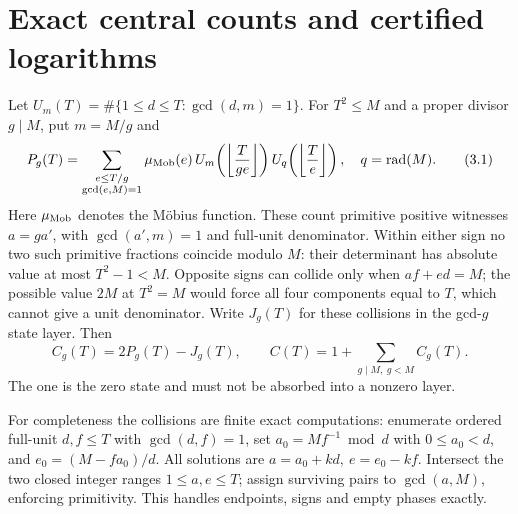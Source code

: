 \documentclass[11pt]{article}
\theoremstyle{definition}\newtheorem{definition}[theorem]{Definition}
\theoremstyle{remark}\newtheorem{remark}[theorem]{Remark}
\newcommand{\rad}{\operatorname{rad}}
\newcommand{\floor}[1]{\left\lfloor #1\right\rfloor}
\begin{document}
\section{Exact central counts and certified logarithms}\label{sec:cert}
Let \(U_m(T)=\#\{1\le d\le T:\gcd(d,m)=1\}\).
For \(T^2\le M\) and a proper divisor \(g\mid M\), put \(m=M/g\) and
\[
 P_g(T)=\sum_{\substack{e\le T/g\\\gcd(e,M)=1}}
     \mu_{\rm Mob}(e)\,
     U_m\!\left(\floor{\frac{T}{ge}}\right)
     U_q\!\left(\floor{\frac Te}\right),\quad q=\rad(M). \tag{3.1}\label{eq:Pg}
\]
Here \(\mu_{\rm Mob}\) denotes the Möbius function.
These count primitive positive witnesses \(a=ga'\), with
\(\gcd(a',m)=1\) and full-unit denominator.
Within either sign no two such primitive fractions coincide modulo \(M\):
their determinant has absolute value at most \(T^2-1<M\).
Opposite signs can collide only when \(af+ed=M\); the possible value \(2M\)
at \(T^2=M\) would force all four components equal to \(T\), which cannot
give a unit denominator. Write \(J_g(T)\) for these collisions in the
gcd-\(g\) state layer. Then
\[
 C_g(T)=2P_g(T)-J_g(T),\qquad
 C(T)=1+\sum_{g\mid M,\ g<M}C_g(T).                   \tag{3.2}\label{eq:central}
\]
The one is the zero state and must not be absorbed into a nonzero layer.

For completeness the collisions are finite exact computations:
enumerate ordered full-unit \(d,f\le T\) with \(\gcd(d,f)=1\),
set \(a_0=Mf^{-1}\bmod d\) with \(0\le a_0<d\), and
\(e_0=(M-fa_0)/d\).
All solutions are
\(a=a_0+kd,\ e=e_0-kf\).
Intersect the two closed integer ranges \(1\le a,e\le T\);
assign surviving pairs to \(\gcd(a,M)\), enforcing primitivity.
This handles endpoints, signs and empty phases exactly.
\end{document}

